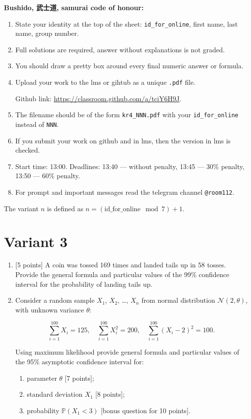 \documentclass[12pt]{article}
\def \cN{\mathcal{N}}
\def \P{\mathbb{P}}
\newcommand \id {\mathrm{id}\_\mathrm{for}\_\mathrm{online}}
\begin{document}
\textbf{Bushido, 武士道, samurai code of honour:}

\vspace{5mm}

\begin{enumerate}
\item State your identity at the top of the sheet: \verb|id_for_online|, first name, last name, group number.
\item Full solutions are required, answer without explanations is not graded. 
\item You should draw a pretty box around every final numeric answer or formula.
\item Upload your work to the lms or gihtub as a unique \verb|.pdf| file.

Github link: \url{https://classroom.github.com/a/tciY6H9J}.
\item The filename should be of the form \verb|kr4_NNN.pdf| with your \verb|id_for_online| instead of \verb|NNN|.
\item If you submit your work on github and in lms, then the version in lms is checked.
\item Start time: 13:00. Deadlines: 13:40 — without penalty, 13:45 — 30\% penalty, 13:50 — 60\% penalty.
\item For prompt and important messages read the telegram channel \verb|@room112|.
\end{enumerate}


\newpage

The variant $n$ is defined as $n=(\id \mod 7)+1$. 


\section*{Variant 3}
\begin{enumerate}

\item {[5 points]} A coin was tossed 169 times and landed tails up in 58 tosses.
Provide the general formula and particular values
of the 99\% confidence interval for the probability of landing tails up.

\item Consider a random sample $X_1$, $X_2$, \ldots, $X_n$ from normal distribution $\cN(2, \theta)$, 
with unknown variance $\theta$:

\[
\sum_{i=1}^{100} X_i = 125, \quad \sum_{i=1}^{100} X_i^2 = 200, \quad \sum_{i=1}^{100} (X_i - 2)^2 = 100.  
\]

Using maximum likelihood 
provide general formula and particular values
of the 95\% asymptotic confidence interval for:

\begin{enumerate}
  \item parameter $\theta$ {[7 points]};
  \item standard deviation $X_1$ {[8 points]};
  \item probability $\P(X_1 < 3)$ {[bonus question for 10 points]}.
\end{enumerate}

\end{enumerate}
\end{document}

